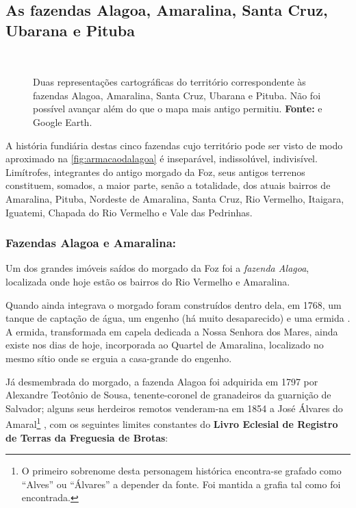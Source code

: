 \begin{citacao}
\subsection{As fazendas Alagoa, Amaralina, Santa Cruz, Ubarana e Pituba}\label{subsec:alagoaamaralina}

\begin{figure}[!htp]
\centering
{}
\  %
\caption{Duas representações cartográficas do território correspondente às fazendas Alagoa, Amaralina, Santa Cruz, Ubarana e Pituba. Não foi possível avançar além do que o mapa mais antigo permitiu. \textbf{Fonte:}  e Google Earth.}
\label{fig:armacaodalagoa}
\end{figure}

A história fundiária destas cinco fazendas cujo território pode ser visto de modo aproximado na \autoref{fig:armacaodalagoa} é inseparável, indissolúvel, indivisível. Limítrofes, integrantes do antigo morgado da Foz, seus antigos terrenos constituem, somados, a maior parte, senão a totalidade, dos atuais bairros de Amaralina, Pituba, Nordeste de Amaralina, Santa Cruz, Rio Vermelho, Itaigara, Iguatemi, Chapada do Rio Vermelho e Vale das Pedrinhas.

\subsubsection{Fazendas Alagoa e Amaralina: }

Um dos grandes imóveis saídos do morgado da Foz foi a \textit{fazenda Alagoa}, localizada onde hoje estão os bairros do Rio Vermelho e Amaralina.

Quando ainda integrava o morgado foram construídos dentro dela, em 1768, um tanque de captação de água, um engenho (há muito desaparecido) e uma ermida \cite[p.~118]{campos_alagoa_1942}. A ermida, transformada em capela dedicada a Nossa Senhora dos Mares, ainda existe nos dias de hoje, incorporada ao Quartel de Amaralina, localizado no mesmo sítio onde se erguia a casa-grande do engenho.

Já desmembrada do morgado, a fazenda Alagoa foi adquirida em 1797 por Alexandre Teotônio de Sousa, tenente-coronel de granadeiros da guarnição de Salvador; alguns seus herdeiros remotos venderam-na em 1854 a José Álvares do Amaral\footnote{O primeiro sobrenome desta personagem histórica encontra-se grafado como ``Alves'' ou ``Álvares'' a depender da fonte. Foi mantida a grafia tal como foi encontrada.} \cite[p.~118]{campos_alagoa_1942}, com os seguintes limites constantes do \textbf{Livro Eclesial de Registro de Terras da Freguesia de Brotas}:


\end{citacao}
